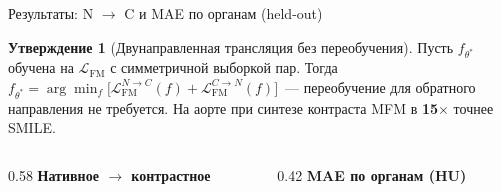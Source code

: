 \documentclass[11pt,aspectratio=169,xcolor=dvipsnames]{beamer}
\theoremstyle{definition}
\newtheorem{prop}{Утверждение}
\begin{document}
\begin{frame}{Результаты: N $\to$ C и MAE по органам (held-out)}

\begin{prop}[Двунаправленная трансляция без переобучения]
Пусть $f_{\theta^*}$ обучена на $\mathcal{L}_{\mathrm{FM}}$ с симметричной выборкой пар. Тогда
$f_{\theta^*} = \arg\min_f \bigl[\mathcal{L}_{\mathrm{FM}}^{N \to C}(f) + \mathcal{L}_{\mathrm{FM}}^{C \to N}(f)\bigr]$~--- переобучение для обратного направления не требуется. На аорте при синтезе контраста MFM в \textbf{15$\times$} точнее SMILE.
\end{prop}

\vspace{0.2cm}
\footnotesize
\begin{columns}[T]
\begin{column}{0.58\textwidth}
\centering
{\scriptsize\textbf{Нативное $\to$ контрастное}}\\[0.1cm]
\renewcommand{\arraystretch}{1.05}
\end{column}
\begin{column}{0.42\textwidth}
\centering
{\scriptsize\textbf{MAE по органам (HU)}}\\[0.1cm]
\renewcommand{\arraystretch}{1.05}
\end{column}
\end{columns}

\end{frame}
\end{document}
